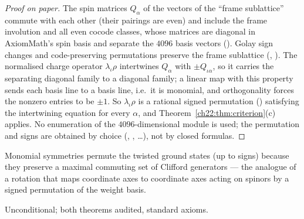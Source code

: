 \begin{proof}[Proof on paper]
The spin matrices $Q_\alpha$ of the vectors of the ``frame sublattice''  commute with each
other (their pairings are even) and include the frame involution and all even cocode classes, whose matrices are
diagonal in AxiomMath's spin basis and separate the $4096$ basis vectors ().  Golay sign
changes and code-preserving permutations preserve the frame sublattice (,
).  The normalised charge operator $\lambda_\iota\rho$ intertwines $Q_\alpha$ with $\pm Q_{\iota\alpha}$, so it
carries the separating diagonal family to a diagonal family; a linear map with this property sends each basis line to a
basis line, i.e.\ it is monomial, and orthogonality forces the nonzero entries to be $\pm1$.  So $\lambda_\iota\rho$ is a rational
signed permutation () satisfying the intertwining equation for every $\alpha$, and
Theorem~\ref{ch22:thm:criterion}(c) applies.  No enumeration of the $4096$-dimensional module is used; the permutation
and signs are obtained by choice (, , \dots), not by closed formulas.
\end{proof}
\begin{physics}
Monomial symmetries permute the twisted ground states (up to signs) because they preserve a maximal commuting set of
Clifford generators --- the analogue of a rotation that maps coordinate axes to coordinate axes acting on spinors by a
signed permutation of the weight basis.
\end{physics}
\begin{status}Unconditional; both theorems audited, standard axioms.\end{status}



